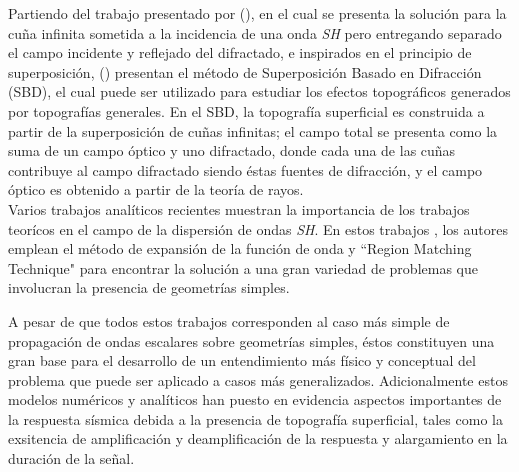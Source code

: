 \documentclass[spanish,letterpaper,12pt,twoside,openany]{article}
\begin{document}
Partiendo del trabajo presentado por \citeauthor{Pathak1974} (\citeyear{Pathak1974}), en el cual se presenta la solución para la cuña infinita sometida a la incidencia de una onda \textit{SH} pero entregando separado el campo incidente y reflejado del difractado, e inspirados en el principio de superposición, \citeauthor{Jaramillo2013} (\citeyear{Jaramillo2013}) presentan el método de Superposición Basado en Difracción (SBD), el cual puede ser utilizado para estudiar los efectos topográficos generados por topografías generales. En el SBD, la topografía superficial es construida a partir de la superposición de cuñas infinitas; el campo total se presenta como la suma de un campo óptico y uno difractado, donde cada una de las cuñas contribuye al campo difractado siendo éstas fuentes de difracción, y el campo óptico es obtenido a partir de la teoría de rayos.\\
%
Varios trabajos analíticos recientes muestran la importancia de los trabajos teorícos en el campo de la dispersión de ondas \textit{SH}. En estos trabajos \citep{Tsaur2008, Tsaur2010a, Tsaur2010b, Han2011, Zhang2012a, Zhang2012b, Gao2012, Tsaur2013, Chang2013}, los autores emplean el método de expansión de la función de onda y ``Region Matching Technique" para encontrar la solución a una gran variedad de problemas que involucran la presencia de geometrías simples.

A pesar de que todos estos trabajos corresponden al caso más simple de propagación de ondas escalares sobre geometrías simples, éstos constituyen una gran base para el desarrollo de un entendimiento más físico y conceptual del problema que puede ser aplicado a casos más generalizados. Adicionalmente estos modelos numéricos y analíticos han puesto en evidencia aspectos importantes de la respuesta sísmica debida a la presencia de topografía superficial, tales como la exsitencia de amplificación y deamplificación de la respuesta y alargamiento en la duración de la señal.
\end{document}
